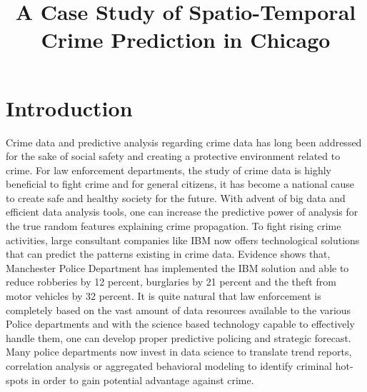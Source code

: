 \documentclass[conference]{IEEEtran}
\begin{document}
\title{A Case Study of Spatio-Temporal Crime Prediction in Chicago\\
}

\author{
}

\maketitle

\section{Introduction}
Crime data and predictive analysis regarding crime data has long been addressed for the sake of social safety and creating a protective environment related to crime. For law enforcement departments, the study of crime data is highly beneficial to fight crime and for general citizens, it has become a national cause to create safe and healthy society for the future. With  advent of big data and  efficient data analysis tools, one can increase the predictive power of analysis for the true random features explaining crime propagation. To fight rising crime activities, large consultant companies like IBM now offers technological solutions that can predict the patterns existing in crime data. Evidence shows that, Manchester Police Department has implemented the IBM solution and  able to reduce robberies by 12 percent, burglaries by 21 percent and the theft from motor vehicles by 32 percent\cite{b5}. It is quite natural that law enforcement is completely based on the vast amount of data resources available to the various Police departments and with the science based technology capable to effectively handle them, one can develop proper predictive policing and strategic forecast. Many police departments now invest in data science to translate trend reports, correlation analysis or aggregated behavioral modeling  to identify criminal hot-spots in order to gain potential advantage against crime. \\
\end{document}

